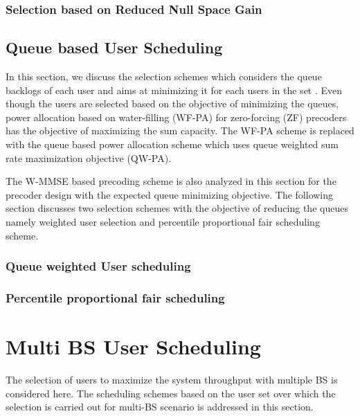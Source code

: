 \documentclass[a4paper,10pt,onecolumn]{article}
\begin{document}


\subsubsection{Selection based on Reduced Null Space Gain}



\subsection{Queue based User Scheduling} \label{qbus}

In this section, we discuss the selection schemes which considers the queue backlogs of each user and aims at minimizing it for each users in the set . Even though the users are selected based on the objective of minimizing the queues, power allocation based on water-filling (WF-PA) for zero-forcing (ZF) precoders has the objective of maximizing the sum capacity. The WF-PA scheme is replaced with the queue based power allocation scheme which uses queue weighted sum rate maximization objective (QW-PA).

The W-MMSE based precoding scheme is also analyzed in this section for the precoder design with the expected queue minimizing objective. The following section discusses two selection schemes with the objective of reducing the queues namely weighted user selection and percentile proportional fair scheduling scheme.

\subsubsection{Queue weighted User scheduling} \label{weighted-queue-sched}



\subsubsection{Percentile proportional fair scheduling}



\section{Multi BS User Scheduling}

The selection of users to maximize the system throughput with multiple BS is considered here. The scheduling schemes based on the user set over which the selection is carried out for multi-BS scenario is addressed in this section.
\end{document}
